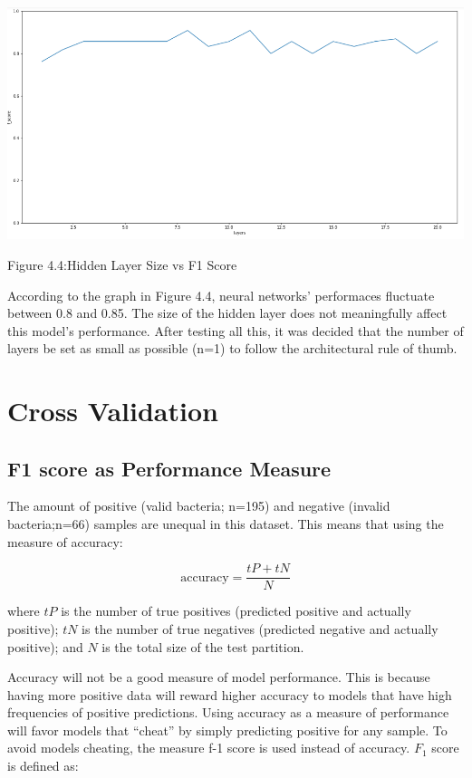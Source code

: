 \documentclass[]{report}
\begin{document}
\includegraphics{images/layersize.png}

\begin{center} Figure 4.4:Hidden Layer Size vs F1 Score \end{center}

According to the graph in Figure 4.4, neural networks' performaces
fluctuate between 0.8 and 0.85. The size of the hidden layer does not
meaningfully affect this model's performance. After testing all this, it
was decided that the number of layers be set as small as possible (n=1)
to follow the architectural rule of thumb.

\section{Cross Validation}\label{cross-validation}

\subsection{F1 score as Performance
Measure}\label{f1-score-as-performance-measure}

The amount of positive (valid bacteria; n=195) and negative (invalid
bacteria;n=66) samples are unequal in this dataset. This means that
using the measure of accuracy:

\begin{equation} \mathrm{accuracy}=\frac{tP + tN}{N}  \end{equation}

where \(tP\) is the number of true positives (predicted positive and
actually positive); \(tN\) is the number of true negatives (predicted
negative and actually positive); and \(N\) is the total size of the test
partition.

Accuracy will not be a good measure of model performance. This is
because having more positive data will reward higher accuracy to models
that have high frequencies of positive predictions. Using accuracy as a
measure of performance will favor models that ``cheat'' by simply
predicting positive for any sample. To avoid models cheating, the
measure f-1 score is used instead of accuracy. \(F_1\) score is defined
as:
\end{document}
